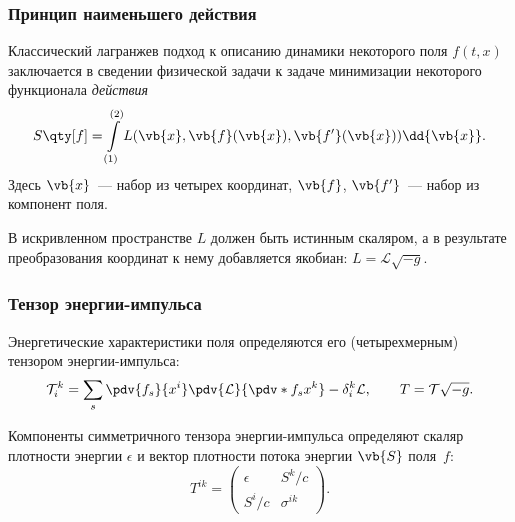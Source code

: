 \documentclass[compress, 9pt]{beamer}
\begin{document}
    \begin{frame}\frametitle{Принцип наименьшего действия}

        Классический лагранжев подход к описанию динамики некоторого поля $f(t,x)$ заключается в сведении физической задачи к задаче минимизации некоторого функционала \textit{действия}\nocite{landau_v1}
        \begin{equation*}
            S\qty[f] = \int\limits_{(1)}^{(2)} L(\vb{x}, \vb{f}(\vb{x}), \vb{f'}(\vb{x})) \dd{\vb{x}}.
        \end{equation*}
        Здесь $\vb{x}$~--- набор из четырех координат, $\vb{f}$, $\vb{f'}$~--- набор из компонент поля.

        В искривленном пространстве $L$ должен быть истинным скаляром, а в результате преобразования координат к нему добавляется якобиан: $L = \mathcal{L} \sqrt{-g}$.

    \end{frame}

    \begin{frame}\frametitle{Тензор энергии-импульса}

        Энергетические характеристики поля определяются его (четырехмерным) тензором энергии-импульса\nocite{landau_v1,landau_v2}:
        \begin{equation*}
            \mathcal{T}_i^k = \sum_s \pdv{f_s}{x^i} \pdv{\mathcal{L}}{\pdv*{f_s}{x^k}} - \delta_i^k \mathcal{L} ,
            \qquad T = \mathcal{T} \sqrt{-g} .
        \end{equation*}

        Компоненты симметричного тензора энергии-импульса определяют скаляр плотности энергии $\epsilon$ и вектор плотности потока энергии $\vb{S}$ поля~$f$:
        \begin{equation*}
            T^{ik} = \begin{pmatrix}
                \epsilon & S^k / c \\
                S^i / c  & \sigma^{ik}
            \end{pmatrix} .
        \end{equation*}

    \end{frame}
\end{document}
